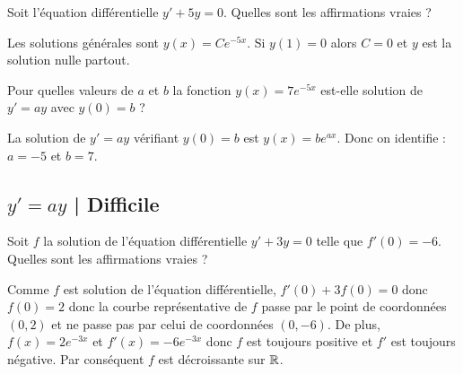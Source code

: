 \begin{question}
Soit l'équation différentielle $y' +5y =0$.
Quelles sont les affirmations vraies ?
\begin{answers}   
\end{answers}
\begin{explanations}
Les solutions générales sont $y(x) = Ce^{-5x}$. Si $y(1)=0$ alors $C=0$ et $y$ est la solution nulle partout.
\end{explanations}
\end{question}


\begin{question}
Pour quelles valeurs de $a$ et $b$ la fonction $y(x) = 7e^{-5x}$ est-elle solution de $y'=ay$ avec $y(0)=b$ ?
\begin{answers}  
\end{answers}
\begin{explanations}
La solution de $y'=ay$ vérifiant $y(0)=b$ est $y(x) = b e^{ax}$. Donc on identifie : $a = -5$ et $b=7$.
\end{explanations}
\end{question}



\subsection{$y'=ay$ | Difficile}

\begin{question}
Soit $f$ la solution de l'équation différentielle $y'+3y=0$ telle que $f'(0)=-6$. Quelles sont les affirmations vraies ?
\begin{answers}
\end{answers}
\begin{explanations} 
Comme $f$ est solution de l'équation différentielle, $f'(0)+3f(0)=0$ donc $f(0)=2$ donc la courbe représentative de $f$ passe par le point de coordonnées $(0,2)$ et ne passe pas par celui de coordonnées $(0,-6)$. De plus, $f(x)=2 e^{-3x}$ et $f'(x)=-6 e^{-3x}$ donc $f$ est toujours positive et $f'$ est toujours négative. Par conséquent $f$ est décroissante sur $\mathbb{R}$.

\end{explanations}
\end{question}


